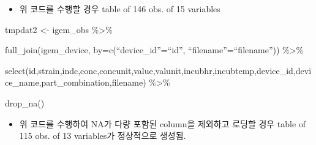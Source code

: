 \documentclass[
]{article}
\providecommand{\tightlist}{%
  \setlength{\itemsep}{0pt}\setlength{\parskip}{0pt}}
\begin{document}
\begin{itemize}
\tightlist
\item
  위 코드를 수행할 경우 table of 146 obs. of 15 variables
\end{itemize}

tmpdat2 \textless- igem\_obs \%\textgreater\%

full\_join(igem\_device, by=c(``device\_id''=``id'',
``filename''=``filename'')) \%\textgreater\%

select(id,strain,indc,conc,concunit,value,valunit,incubhr,incubtemp,device\_id,device\_name,part\_combination,filename)
\%\textgreater\%

drop\_na()

\begin{itemize}
\tightlist
\item
  위 코드를 수행하여 NA가 다량 포함된 column을 제외하고 로딩할 경우
  table of 115 obs. of 13 variables가 정상적으로 생성됨.
\end{itemize}
\end{document}
